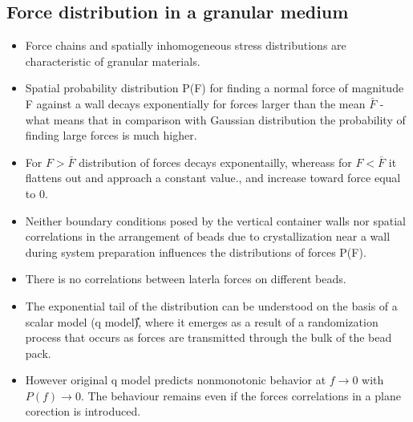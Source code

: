 \documentclass[10pt,a4paper]{article}
\begin{document}
\subsection{Force distribution in a granular medium \cite{nagel2:98}}
\begin{itemize}
 \item Force chains and spatially inhomogeneous stress distributions are characteristic of granular materials.
 \item Spatial probability distribution P(F) for finding a normal force of magnitude F against a wall 
 decays exponentially for forces larger than the mean   $\bar{F}$ - what means that in comparison with Gaussian  distribution
 the probability of finding large forces is much higher. 
 \item For $F > \bar{F}$ distribution of forces decays exponentailly, whereass for $F < \bar{F}$ it flattens out and approach a constant value.,
 and increase toward force equal to 0.
 \item Neither boundary conditions posed by the vertical container walls 
 nor spatial correlations in the arrangement of beads due to crystallization near a wall during system preparation 
 influences the distributions of forces P(F).
 \item There is no correlations between laterla forces on different beads. 
 \item The exponential tail of the distribution can be understood on the basis of a scalar model (q model)͒,
 where it emerges as a result of a randomization process that occurs as forces are transmitted through the bulk of the bead pack.
 \item However original q model predicts nonmonotonic behavior at $f\rightarrow0$ with $P(f)\rightarrow0$. 
 The behaviour remains even if the forces correlations in a plane corection is introduced.
\end{itemize}
\end{document}
